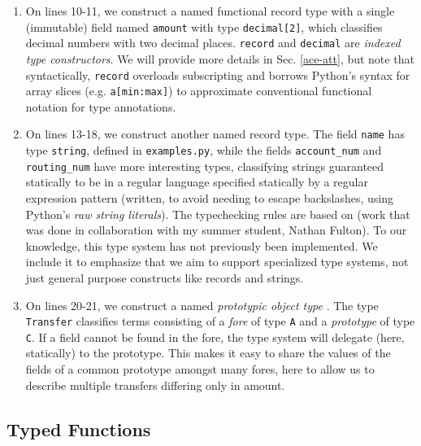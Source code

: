 \begin{enumerate}
\item On lines 10-11, we construct a named functional record type with a single (immutable) field named \verb|amount| with type \verb|decimal[2]|, which classifies decimal numbers with two decimal places. \verb|record| and \verb|decimal| are \emph{indexed type constructors}. We will provide more details in Sec. \ref{ace-att}, but note that syntactically, \verb|record| overloads subscripting and borrows Python's syntax for array slices (e.g. \verb|a[min:max]|) to approximate conventional functional notation for type annotations. %
\item On lines 13-18, we construct another named record type. The field \verb|name| has type \verb|string|, defined in \verb|examples.py|, while the fields \verb|account_num| and \verb|routing_num| have more interesting types, classifying strings guaranteed statically to be in a regular language specified statically by a  regular expression pattern (written, to avoid needing to escape backslashes, using Python's \emph{raw string literals}). The typechecking rules are based on \cite{fulton-thesis} (work that was done in collaboration with my summer student, Nathan Fulton). To our knowledge, this type system has not previously been implemented. We include it to emphasize that we aim to support specialized type systems,  not just general purpose constructs like records and strings.
\item 
On lines 20-21, we construct a named \emph{prototypic object type} \cite{Lie86}. The type \verb|Transfer| classifies terms consisting of a \emph{fore} of type \verb|A| and a \emph{prototype} of type \verb|C|. If a field cannot be found in the fore, the type system will delegate (here, statically) to the prototype. This makes it easy to share the values of the fields of a common prototype amongst many fores, here to allow us to describe multiple transfers differing only in amount.
\end{enumerate}
\subsection{Typed Functions}

